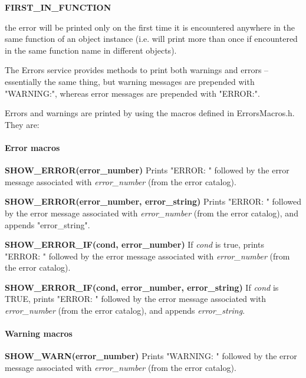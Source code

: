 \begin{minipage}{\dimexpr\textwidth-2em}
        \medskip
        \begin{minipage}[t][][b]{14.0em}\textbf{FIRST\_IN\_FUNCTION}\end{minipage}
        \begin{minipage}[t][][b]{\dimexpr\textwidth-14.5em}
            the error will be printed only on the first time it is encountered anywhere in the same function of an object instance (i.e. will print more than once if encountered in the same function name in different objects).
        \end{minipage}\vfill
\end{minipage}

\bigskip
The Errors service provides methods to print both warnings and errors -- essentially the same thing, but warning messages are prepended with "WARNING:", whereas error messages are prepended with "ERROR:".

Errors and warnings are printed by using the macros defined in ErrorsMacros.h.  They are:
 
\paragraph{\Large{Error macros}}\mbox{}

\medskip
\textbf{SHOW\_ERROR(error\_number)}
Prints "ERROR: " followed by the error message associated with \textit{error\_number} (from the error catalog).

\medskip
\textbf{SHOW\_ERROR(error\_number, error\_string)}
Prints "ERROR: " followed by the error message associated with \textit{error\_number} (from the error catalog), and appends "error\_string".

\medskip
\textbf{SHOW\_ERROR\_IF(cond, error\_number)}
If \textit{cond} is true, prints "ERROR: " followed by the error message associated with \textit{error\_number} (from the error catalog).

\medskip
\textbf{SHOW\_ERROR\_IF(cond, error\_number, error\_string)}
If \textit{cond} is TRUE, prints "ERROR: " followed by the error message associated with \textit{error\_number} (from the error catalog), and appends \textit{error\_string}.


\paragraph{\Large{Warning macros}}\mbox{}

\medskip
\textbf{SHOW\_WARN(error\_number)}
Prints "WARNING: " followed by the error message associated with \textit{error\_number} (from the error catalog).

